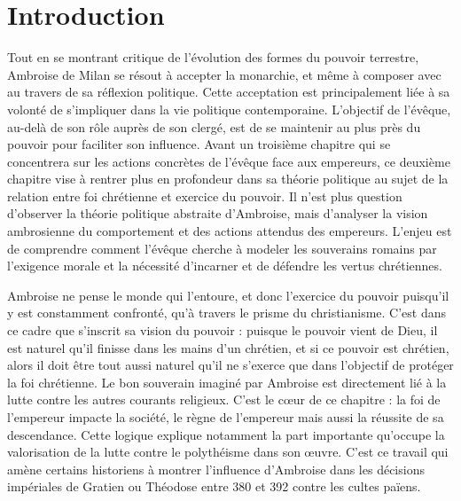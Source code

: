 \section*{Introduction}

Tout en se montrant critique de l'évolution des formes du pouvoir terrestre, Ambroise de Milan se résout à accepter la monarchie, et même à composer avec au travers de sa réflexion politique. Cette acceptation est principalement liée à sa volonté de s'impliquer dans la vie politique contemporaine. L'objectif de l'évêque, au-delà de son rôle auprès de son clergé, est de se maintenir au plus près du pouvoir pour faciliter son influence. Avant un troisième chapitre qui se concentrera sur les actions concrètes de l'évêque face aux empereurs, ce deuxième chapitre vise à rentrer plus en profondeur dans sa théorie politique au sujet de la relation entre foi chrétienne et exercice du pouvoir. Il n'est plus question d'observer la théorie politique abstraite d'Ambroise, mais d'analyser la vision ambrosienne du comportement et des actions attendus des empereurs. L'enjeu est de comprendre comment l'évêque cherche à modeler les souverains romains par l'exigence morale et la nécessité d'incarner et de défendre les vertus chrétiennes.

\bigskip

Ambroise ne pense le monde qui l'entoure, et donc l'exercice du pouvoir puisqu'il y est constamment confronté, qu'à travers le prisme du christianisme. C'est dans ce cadre que s'inscrit sa vision du pouvoir : puisque le pouvoir vient de Dieu, il est naturel qu'il finisse dans les mains d'un chrétien, et si ce pouvoir est chrétien, alors il doit être tout aussi naturel qu'il ne s'exerce que dans l'objectif de protéger la foi chrétienne. Le bon souverain imaginé par Ambroise est directement lié à la lutte contre les autres courants religieux. C'est le cœur de ce chapitre : la foi de l'empereur impacte la société, le règne de l'empereur mais aussi la réussite de sa descendance. Cette logique explique notamment la part importante qu'occupe la valorisation de la lutte contre le polythéisme dans son œuvre. C'est ce travail qui amène certains historiens à montrer l'influence d'Ambroise dans les décisions impériales de Gratien ou Théodose entre 380 et 392 contre les cultes païens.

\bigskip

